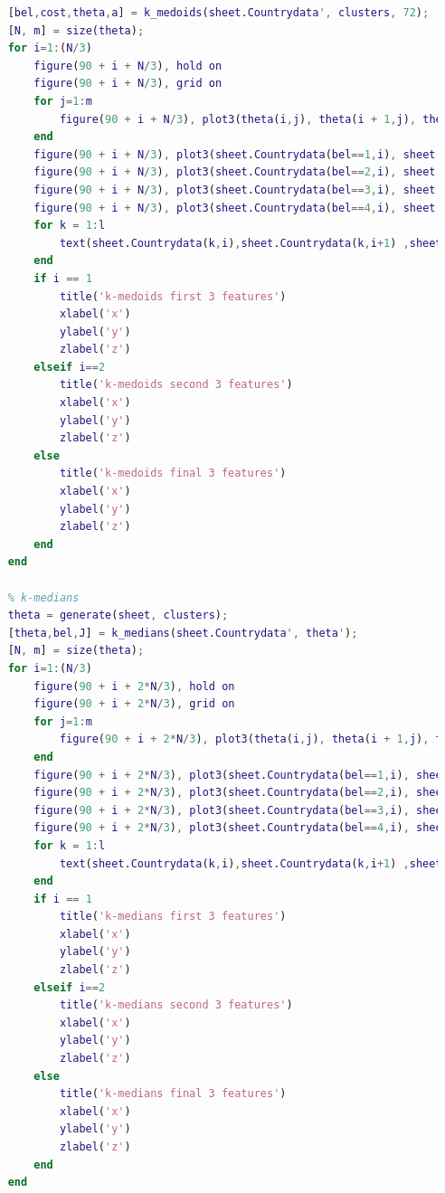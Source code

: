 \documentclass[12pt, a4paper]{article}
\begin{document}
\begin{lstlisting}[language=Matlab, label=lst:final, caption=The entire code as it was upon completion.]
    % k-medoids
    [bel,cost,theta,a] = k_medoids(sheet.Countrydata', clusters, 72);
    [N, m] = size(theta);
    for i=1:(N/3)
        figure(90 + i + N/3), hold on
        figure(90 + i + N/3), grid on
        for j=1:m
            figure(90 + i + N/3), plot3(theta(i,j), theta(i + 1,j), theta(i + 2,j), 'k+')
        end
        figure(90 + i + N/3), plot3(sheet.Countrydata(bel==1,i), sheet.Countrydata(bel==1, i+ 1), sheet.Countrydata(bel==1,i+2), 'ro')
        figure(90 + i + N/3), plot3(sheet.Countrydata(bel==2,i), sheet.Countrydata(bel==2, i+ 1), sheet.Countrydata(bel==2,i+2), 'g*')
        figure(90 + i + N/3), plot3(sheet.Countrydata(bel==3,i), sheet.Countrydata(bel==3, i+ 1), sheet.Countrydata(bel==3,i+2), 'b.')
        figure(90 + i + N/3), plot3(sheet.Countrydata(bel==4,i), sheet.Countrydata(bel==4, i+ 1), sheet.Countrydata(bel==4,i+2), 'ys')
        for k = 1:l
            text(sheet.Countrydata(k,i),sheet.Countrydata(k,i+1) ,sheet.Countrydata(k,i+2) , sheet.country(k), 'FontSize', 8, 'HorizontalAlignment', 'left')
        end
        if i == 1
            title('k-medoids first 3 features')
            xlabel('x')
            ylabel('y')
            zlabel('z')
        elseif i==2
            title('k-medoids second 3 features')
            xlabel('x')
            ylabel('y')
            zlabel('z')
        else
            title('k-medoids final 3 features')
            xlabel('x')
            ylabel('y')
            zlabel('z')
        end
    end

    % k-medians
    theta = generate(sheet, clusters);
    [theta,bel,J] = k_medians(sheet.Countrydata', theta');
    [N, m] = size(theta);
    for i=1:(N/3)
        figure(90 + i + 2*N/3), hold on
        figure(90 + i + 2*N/3), grid on
        for j=1:m
            figure(90 + i + 2*N/3), plot3(theta(i,j), theta(i + 1,j), theta(i + 2,j), 'k+')
        end
        figure(90 + i + 2*N/3), plot3(sheet.Countrydata(bel==1,i), sheet.Countrydata(bel==1, i+ 1), sheet.Countrydata(bel==1,i+2), 'ro')
        figure(90 + i + 2*N/3), plot3(sheet.Countrydata(bel==2,i), sheet.Countrydata(bel==2, i+ 1), sheet.Countrydata(bel==2,i+2), 'g*')
        figure(90 + i + 2*N/3), plot3(sheet.Countrydata(bel==3,i), sheet.Countrydata(bel==3, i+ 1), sheet.Countrydata(bel==3,i+2), 'b.')
        figure(90 + i + 2*N/3), plot3(sheet.Countrydata(bel==4,i), sheet.Countrydata(bel==4, i+ 1), sheet.Countrydata(bel==4,i+2), 'ys')
        for k = 1:l
            text(sheet.Countrydata(k,i),sheet.Countrydata(k,i+1) ,sheet.Countrydata(k,i+2) , sheet.country(k), 'FontSize', 8, 'HorizontalAlignment', 'left')
        end
        if i == 1
            title('k-medians first 3 features')
            xlabel('x')
            ylabel('y')
            zlabel('z')
        elseif i==2
            title('k-medians second 3 features')
            xlabel('x')
            ylabel('y')
            zlabel('z')
        else
            title('k-medians final 3 features')
            xlabel('x')
            ylabel('y')
            zlabel('z')
        end
    end


\end{lstlisting}
\end{document}

